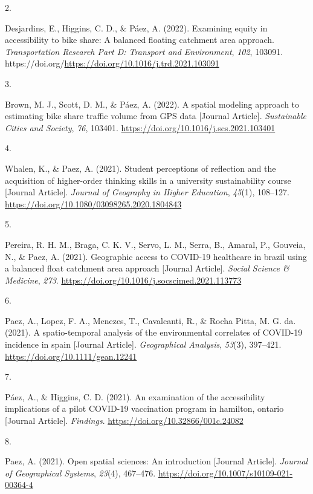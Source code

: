 \documentclass[11pt,a4paper,]{awesome-cv}
\newlength{\csllabelwidth}
\newcommand{\CSLLeftMargin}[1]{\parbox[t]{\csllabelwidth}{#1}}
\newcommand{\CSLRightInline}[1]{\parbox[t]{\linewidth - \csllabelwidth}{#1}}
\begin{document}
\leavevmode{}%
\CSLLeftMargin{2. }
\CSLRightInline{Desjardins, E., Higgins, C. D., \& Páez, A. (2022).
Examining equity in accessibility to bike share: A balanced floating
catchment area approach. \emph{Transportation Research Part D: Transport
and Environment}, \emph{102}, 103091.
https://doi.org/\url{https://doi.org/10.1016/j.trd.2021.103091}}

\leavevmode{}%
\CSLLeftMargin{3. }
\CSLRightInline{Brown, M. J., Scott, D. M., \& Páez, A. (2022). A
spatial modeling approach to estimating bike share traffic volume from
GPS data {[}Journal Article{]}. \emph{Sustainable Cities and Society},
\emph{76}, 103401. \url{https://doi.org/10.1016/j.scs.2021.103401}}

\leavevmode{}%
\CSLLeftMargin{4. }
\CSLRightInline{Whalen, K., \& Paez, A. (2021). Student perceptions of
reflection and the acquisition of higher-order thinking skills in a
university sustainability course {[}Journal Article{]}. \emph{Journal of
Geography in Higher Education}, \emph{45}(1), 108--127.
\url{https://doi.org/10.1080/03098265.2020.1804843}}

\leavevmode{}%
\CSLLeftMargin{5. }
\CSLRightInline{Pereira, R. H. M., Braga, C. K. V., Servo, L. M., Serra,
B., Amaral, P., Gouveia, N., \& Paez, A. (2021). Geographic access to
COVID-19 healthcare in brazil using a balanced float catchment area
approach {[}Journal Article{]}. \emph{Social Science \& Medicine},
\emph{273}. \url{https://doi.org/10.1016/j.socscimed.2021.113773}}

\leavevmode{}%
\CSLLeftMargin{6. }
\CSLRightInline{Paez, A., Lopez, F. A., Menezes, T., Cavalcanti, R., \&
Rocha Pitta, M. G. da. (2021). A spatio-temporal analysis of the
environmental correlates of COVID-19 incidence in spain {[}Journal
Article{]}. \emph{Geographical Analysis}, \emph{53}(3), 397--421.
\url{https://doi.org/10.1111/gean.12241}}

\leavevmode{}%
\CSLLeftMargin{7. }
\CSLRightInline{Páez, A., \& Higgins, C. D. (2021). An examination of
the accessibility implications of a pilot COVID-19 vaccination program
in hamilton, ontario {[}Journal Article{]}. \emph{Findings}.
\url{https://doi.org/10.32866/001c.24082}}

\leavevmode{}%
\CSLLeftMargin{8. }
\CSLRightInline{Paez, A. (2021). Open spatial sciences: An introduction
{[}Journal Article{]}. \emph{Journal of Geographical Systems},
\emph{23}(4), 467--476.
\url{https://doi.org/10.1007/s10109-021-00364-4}}
\end{document}
